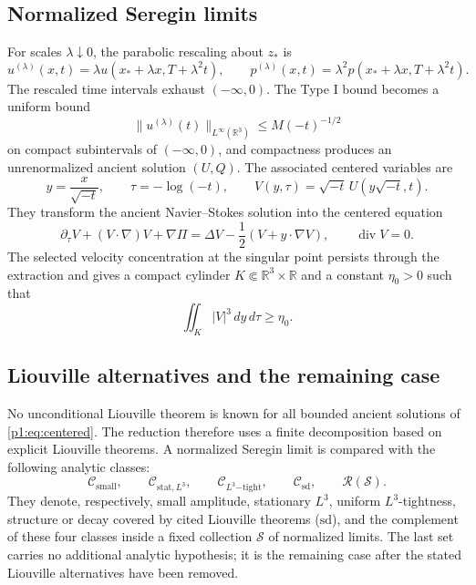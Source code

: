 \documentclass[11pt]{amsart}
\theoremstyle{plain}
\theoremstyle{definition}
\theoremstyle{remark}
\numberwithin{equation}{section}
\newcommand{\R}{\mathbb R}
\newcommand{\divergence}{\operatorname{div}}
\newcommand{\calS}{\mathcal S}
\newcommand{\calR}{\mathcal R}
\newcommand{\calC}{\mathcal C}
\begin{document}
\subsection{Normalized Seregin limits}

For scales \(\lambda\downarrow0\), the parabolic rescaling about \(z_*\) is
\[
   u^{(\lambda)}(x,t)
   =
   \lambda u(x_*+\lambda x,T+\lambda^2t),\qquad
   p^{(\lambda)}(x,t)
   =
   \lambda^2p(x_*+\lambda x,T+\lambda^2t).
\]
The rescaled time intervals exhaust \((-\infty,0)\).  The Type I bound
becomes a uniform bound
\[
   \|u^{(\lambda)}(t)\|_{L^\infty(\R^3)}
   \le M(-t)^{-1/2}
\]
on compact subintervals of \((-\infty,0)\), and compactness produces an
unrenormalized ancient solution \((U,Q)\).  The associated centered variables
are
\[
   y=\frac{x}{\sqrt{-t}},\qquad
   \tau=-\log(-t),\qquad
   V(y,\tau)=\sqrt{-t}\,U(y\sqrt{-t},t).
\]
They transform the ancient Navier--Stokes solution into the centered equation
\begin{equation}\label{p1:eq:centered}
   \partial_\tau V+(V\cdot\nabla)V+\nabla\Pi
   =
   \Delta V-\frac12(V+y\cdot\nabla V),
   \qquad \divergence V=0.
\end{equation}
The selected velocity concentration at the singular point persists through
the extraction and gives a compact cylinder \(K\Subset\R^3\times\R\) and a
constant \(\eta_0>0\) such that
\begin{equation}\label{p1:eq:nonvanishing}
   \iint_K |V|^3\,dy\,d\tau\ge\eta_0 .
\end{equation}

\subsection{Liouville alternatives and the remaining case}

No unconditional Liouville theorem is known for all bounded ancient solutions
of \eqref{p1:eq:centered}.  The reduction therefore uses a finite decomposition
based on explicit Liouville theorems.  A normalized Seregin limit is compared with the
following analytic classes:
\[
   \calC_{\mathrm{small}},\qquad
   \calC_{\mathrm{stat},L^3},\qquad
   \calC_{L^3\mathrm{-tight}},\qquad
   \calC_{\mathrm{sd}},\qquad
   \calR(\calS).
\]
They denote, respectively, small amplitude, stationary \(L^3\), uniform
\(L^3\)-tightness, structure or decay covered by cited Liouville theorems
(\(\mathrm{sd}\)), and the complement of these four classes inside a fixed
collection \(\calS\) of normalized limits.  The last set carries no additional
analytic hypothesis; it is the remaining case after the stated Liouville
alternatives have been removed.
\end{document}
